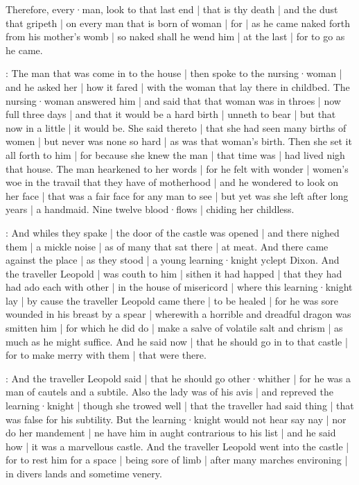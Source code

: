 

Therefore,
every·man,
look to that last end |
that is thy death |
and the dust that gripeth |
on every man that is born of woman |
for |
as he came naked forth from his mother's womb |
so naked shall he wend him |
at the last |
for to go as he came.%


:
The man that was come in to the house |
then spoke to the nursing·woman |
and he asked her |
how it fared |
with the woman that lay there in childbed.
The nursing·woman answered him |
and said that that woman was in throes |
now full three days |
and that it would be a hard birth |
unneth to bear |
but that now in a little |
it would be.
She said thereto |
that she had seen many births of women |
but never was none so hard |
as was that woman's birth.
Then she set it all forth to him |
for because she knew the man |
that time was |
had lived nigh that house.
The man hearkened to her words |
for he felt with wonder |
women's woe in the travail that they have of motherhood |
and he wondered to look on her face |
that was a fair face for any man to see |
but yet was she left after long years |
a handmaid.
Nine twelve blood·flows |
chiding her childless.



:
And whiles they spake |
the door of the castle was opened |
and there nighed them |
a mickle noise |
as of many that sat there |
at meat.
And there came against the place |
as they stood |
a young learning·knight yclept Dixon.
And the traveller Leopold |
was couth to him |
sithen it had happed |
that they had had ado each with other |
in the house of misericord |
where this learning·knight lay |
by cause the traveller Leopold came there |
to be healed |
for he was sore wounded in his breast by a spear |
wherewith a horrible and dreadful dragon was smitten him |
for which he did do |
make a salve of volatile salt and chrism |
as much as he might suffice.
And he said now |
that he should go in to that castle |
for to make merry with them |
that were there.

:
And the traveller Leopold said |
that he should go other·whither |
for he was a man of cautels and a subtile.
Also the lady was of his avis |
and repreved the learning·knight |
though she trowed well |
that the traveller had said thing |
that was false for his subtility.
But the learning·knight would not hear say nay |
nor do her mandement |
ne have him in aught contrarious to his list |
and he said how |
it was a marvellous castle.
And the traveller Leopold went into the castle |
for to rest him for a space |
being sore of limb |
after many marches environing |
in divers lands and sometime venery.

